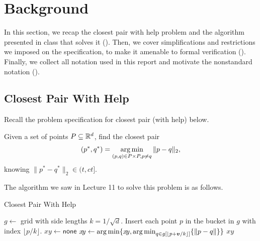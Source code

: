 \documentclass{article}
\begin{document}

\section{Background}
In this section, we recap the closest pair with help problem and the algorithm presented in class that solves it ().
Then, we cover simplifications and restrictions we imposed on the specification, to make it amenable to formal verification ().
Finally, we collect all notation used in this report and motivate the nonstandard notation ().

\subsection{Closest Pair With Help}\label{sec:cp_with_help}
Recall the problem specification for closest pair (with help) below.

\begin{tcbproblem}{}{}
  Given a set of points $P \subseteq \mathbb{R}^d$, find the closest pair
  \[ (p^*, q^*) = \operatorname*{arg\,min}_{(p,q) \in P\times P, p\neq q} \|p - q\|_2, \]
  knowing $\|p^* - q^*\|_2 \in (t, ct]$.
\end{tcbproblem}

The algorithm we saw in Lecture 11 to solve this problem is as follows.
\begin{algorithm}
  \caption{Closest Pair With Help}\label{alg:cp_with_help}
  \begin{algorithmic}
  \State $g \gets $ grid with side lengths $k = 1/\sqrt{d}$.
  \State Insert each point $p$ in the bucket in $g$ with index $\lfloor p / k \rfloor$.
  \State $x\!y \gets \mathsf{none}$
      \State $x\!y \gets \operatorname*{arg\,min} \{ x\!y, \operatorname*{arg\,min}_{q \in g[\lfloor p+\bm{v} / k \rfloor]}\{\| p - q \|\}\}$
    \EndFor
  \EndFor
  \State \Return $x\!y$
  \end{algorithmic}
\end{algorithm}
\end{document}
